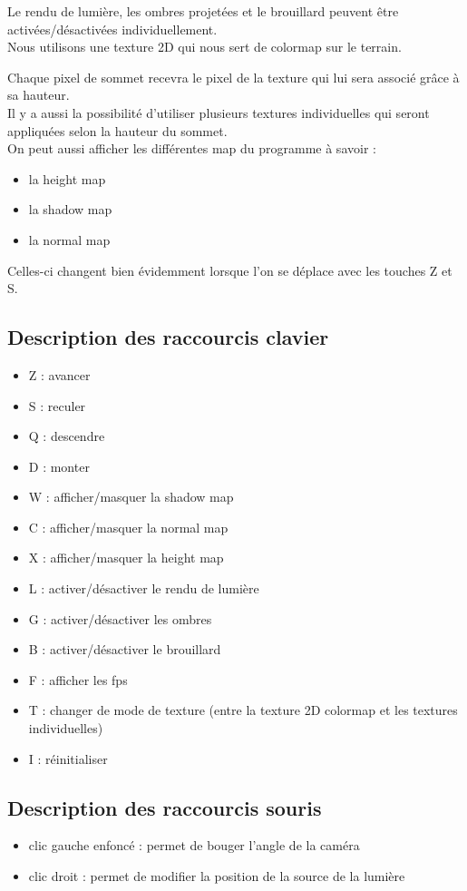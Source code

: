 \documentclass{article}
\begin{document}
Le rendu de lumière, les ombres projetées et le brouillard peuvent être activées/désactivées individuellement.\\

Nous utilisons une texture 2D qui nous sert de colormap sur le terrain.

Chaque pixel de sommet recevra le pixel de la texture qui lui sera associé grâce à sa hauteur.\\

Il y a aussi la possibilité d'utiliser plusieurs textures individuelles qui seront appliquées selon la hauteur du sommet.\\

On peut aussi afficher les différentes map du programme à savoir :
\begin{itemize}
	\item la height map
	\item la shadow map 
	\item la normal map
\end{itemize}

Celles-ci changent bien évidemment lorsque l'on se déplace avec les touches Z et S.

\subsection{Description des raccourcis clavier}
\begin{itemize}
	\item Z : avancer
	\item S : reculer
	\item Q : descendre
	\item D : monter
	\item W : afficher/masquer la shadow map
	\item C : afficher/masquer la normal map
	\item X : afficher/masquer la height map
	\item L : activer/désactiver le rendu de lumière
	\item G : activer/désactiver les ombres
	\item B : activer/désactiver le brouillard
	\item F : afficher les fps
	\item T : changer de mode de texture (entre la texture 2D colormap et les textures individuelles)
	\item I : réinitialiser
\end{itemize}

\subsection{Description des raccourcis souris}
\begin{itemize}
	\item clic gauche enfoncé : permet de bouger l'angle de la caméra
	\item clic droit : permet de modifier la position de la source de la lumière
\end{itemize}
\end{document}
